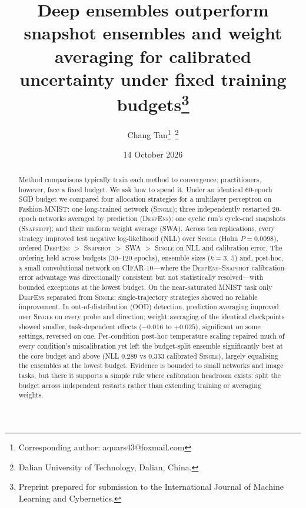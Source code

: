 \documentclass[11pt,a4paper]{article}
\newcommand{\deepens}{\textsc{DeepEns}}
\newcommand{\snapshot}{\textsc{Snapshot}}
\newcommand{\swa}{\textsc{SWA}}
\newcommand{\single}{\textsc{Single}}
\begin{document}
\title{Deep ensembles outperform snapshot ensembles and weight
averaging for calibrated uncertainty under fixed training
budgets\thanks{Preprint prepared for submission
to the International Journal of Machine Learning and Cybernetics.}}
\author{Chang Tan\thanks{Corresponding author: aquars43@foxmail.com}\,%
\thanks{Dalian University of Technology, Dalian, China.}}
\date{14 October 2026}
\maketitle

\begin{abstract}
\noindent Method comparisons typically train each method to convergence;
practitioners, however, face a fixed budget. We ask how to spend it.
Under an identical 60-epoch SGD budget we compared
four allocation strategies for a multilayer perceptron on Fashion-MNIST:
one long-trained network (\single); three independently restarted
20-epoch networks averaged by prediction (\deepens); one cyclic run's
cycle-end snapshots (\snapshot); and their uniform weight average
(\swa). Across ten replications, every strategy improved test
negative log-likelihood (NLL) over \single{} (Holm $P=0.0098$),
ordered \deepens{} $>$ \snapshot{} $>$ \swa{} $>$ \single{} on
NLL and calibration error. The ordering held across budgets
(30--120 epochs), ensemble sizes ($k=3$, $5$) and, post-hoc, a small
convolutional network on CIFAR-10---where the \deepens{}--\snapshot{}
calibration-error advantage was directionally consistent but not
statistically resolved---with bounded exceptions at the lowest budget.
On the near-saturated MNIST task only \deepens{} separated from
\single{}; single-trajectory strategies showed no reliable
improvement. In out-of-distribution (OOD) detection, prediction averaging
improved over \single{} on every probe and direction; weight averaging of
the identical checkpoints showed smaller, task-dependent effects
($-0.016$ to $+0.025$), significant on some settings, reversed on one.
Per-condition post-hoc temperature scaling repaired much of every
condition's miscalibration yet left the budget-split ensemble
significantly best at the core budget and above (NLL 0.289 vs 0.333
calibrated \single{}), largely equalising the ensembles at the
lowest budget. Evidence is bounded to small networks and image tasks,
but there it supports a simple rule where calibration
headroom exists: split the budget across independent restarts rather
than extending training or averaging weights.
\end{abstract}
\end{document}
